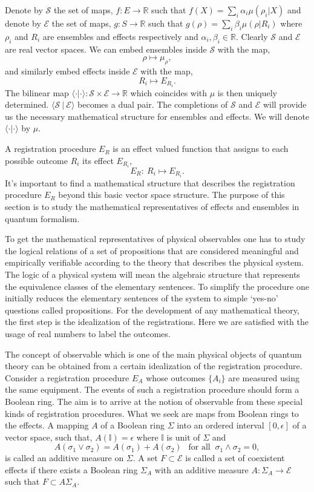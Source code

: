 \documentclass[11pt]{report}
\begin{document}
	Denote by $\mathcal{S}$ the set of maps, $f:E\longrightarrow\mathbb{R}$ such that $f(X)=\sum_i \alpha_i \mu(\rho_i |X)$ and denote by $\mathcal{E}$ the set of maps, $g:S\longrightarrow\mathbb{R}$ such that $g(\rho)=\sum_i\beta_i \mu(\rho | R_i)$ where $\rho_i$ and $R_i$ are ensembles and effects respectively and $\alpha_i ,\beta_i\in\mathbb{R}$. Clearly $\mathcal{S}$ and $\mathcal{E}$ are real vector spaces. We can embed ensembles inside $\mathcal{S}$ with the map, 
	$$\rho\longmapsto \mu_\rho,$$
	and similarly embed effects inside $\mathcal{E}$ with the map, 
	$$R_i\longmapsto E_{R_i}.$$
	The bilinear map $\langle\cdot|\cdot\rangle : \mathcal{S}\times \mathcal{E}\to \mathbb{R}$ which coincides with $\mu$ is then uniquely determined. $\langle \mathcal{S}\:|\: \mathcal{E}\rangle$ becomes a dual pair. The completions of $\mathcal{S}$ and $\mathcal{E}$ will provide us the necessary mathematical structure for ensembles and effects. We will denote $\langle \cdot |\cdot \rangle$ by $\mu$. 
	
	A registration procedure $E_R$ is an effect valued function that assigns to each possible outcome $R_i$ its effect $E_{R_i}$, 
	$$E_R:\:R_i\longmapsto E_{R_i}.$$
	It's important to find a mathematical structure that describes the registration procedure $E_R$ beyond this basic vector space structure. The purpose of this section is to study the mathematical representatives of effects and ensembles in quantum formalism.
	
	To get the mathematical representatives of physical observables one has to study the logical relations of a set of propositions that are considered meaningful and empirically verifiable according to the theory that describes the physical system. The logic of a physical system will mean the algebraic structure that represents the equivalence classes of the elementary sentences.  To simplify the procedure one initially reduces the elementary sentences of the system to simple `yes-no' questions called propositions. For the development of any mathematical theory, the first step is the idealization of the registrations. Here we are satisfied with the usage of real numbers to label the outcomes. 
	
	The concept of observable which is one of the main physical objects of quantum theory can be obtained from a certain idealization of the registration procedure. Consider a registration procedure $E_A$ whose outcomes $\{A_i\}$ are measured using the same equipment. The events of such a registration procedure should form a Boolean ring. The aim is to arrive at the notion of observable from these special kinds of registration procedures. What we seek are maps from Boolean rings to the effects. A mapping $A$ of a Boolean ring $\Sigma$ into an ordered interval $[0,\epsilon]$ of a vector space, such that, $A(\mathbb{I})=\epsilon$ where $\mathbb{I}$ is unit of $\Sigma$ and 
	$$A(\sigma_1 \vee\sigma_2)=A(\sigma_1)+A(\sigma_2)\:\:\text{ for all } \:\sigma_1\wedge \sigma_2=0,$$
	is called an additive measure on $\Sigma$. A set $F\subset \mathcal{E}$ is called a set of coexistent effects if there exists a Boolean ring $\Sigma_A$ with an additive measure $A:\Sigma_A\xrightarrow{}\mathcal{E}$ such that $F\subset A\Sigma_A$. 
	
\end{document}
